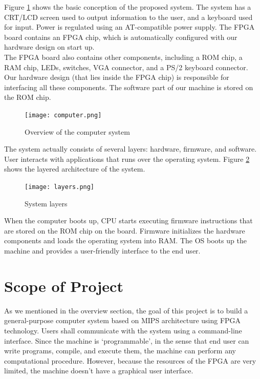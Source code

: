 \documentclass[oneside]{book}
\begin{document}
Figure \ref{computer} shows the basic conception of the proposed system.
The system has a CRT/LCD screen used to output information to the user,
and a keyboard used for input. Power is regulated using an AT-compatible
power supply. The FPGA board contains an FPGA chip, which is automatically
configured with our hardware design on start up.\\

The FPGA board also contains other components, including a ROM chip,
a RAM chip, LEDs, switches, VGA connector, and a PS/2 keyboard connector.
Our hardware design (that lies inside the FPGA chip) is responsible for
interfacing all these components. The software part of our machine
is stored on the ROM chip.

\begin{figure}[H]
\begin{center}
\texttt{[image: computer.png]}
\end{center}
\caption{Overview of the computer system}
\label{computer}
\end{figure}

The system actually consists of several layers: hardware, firmware, and
software. User interacts with applications that runs over the operating
system. Figure \ref{layers} shows the layered architecture of the system.

\begin{figure}[H]
\begin{center}
\texttt{[image: layers.png]}
\end{center}
\caption{System layers}
\label{layers}
\end{figure}

When the computer boots up, CPU starts executing firmware instructions that
are stored on the ROM chip on the board. Firmware initializes the hardware
components and loads the operating system into RAM. The OS boots up
the machine and provides a user-friendly interface to the end user.

\section{Scope of Project}

As we mentioned in the overview section, the goal of this project is to build a
general-purpose computer system based on MIPS architecture
using FPGA technology. Users shall communicate with the system using
a command-line interface. Since the machine is `programmable', in the
sense that end user can write programs, compile, and execute them, the machine
can perform any computational procedure. However, because the resources of
the FPGA are very limited, the machine doesn't have a graphical user interface.
\end{document}
